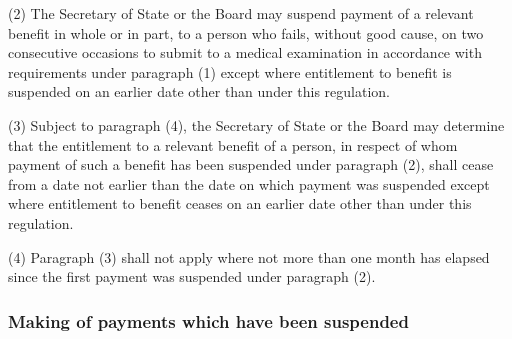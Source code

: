 \documentclass[12pt,a4paper]{article}
\begin{document}
(2) The Secretary of State 
or the Board  %
may suspend payment of a relevant benefit in whole or in part, to a person who fails, without good cause, on two consecutive occasions to submit to a medical examination in accordance with requirements under paragraph (1) except where entitlement to benefit is suspended on an earlier date other than under this regulation.

(3) Subject to paragraph (4), the Secretary of State 
or the Board  %
may determine that the entitlement to a relevant benefit of a person, in respect of whom payment of such a benefit has been suspended under paragraph (2), shall cease from a date not earlier than the date on which payment was suspended except where entitlement to benefit ceases on an earlier date other than under this regulation.

(4) Paragraph (3) shall not apply where not more than one month has elapsed since the first payment was suspended under paragraph (2).

\enlargethispage{\baselineskip}


\subsubsection[20. Making of payments which have been suspended]{Making of payments which have been suspended}
\end{document}
